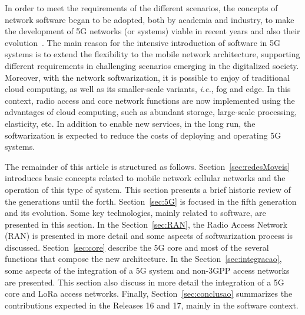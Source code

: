 In order to meet the requirements of the different scenarios, the concepts of network software began to be adopted, both by academia and industry, to make the development of 5G networks (or systems) viable in recent years and also their evolution~\cite{foukas2017network}. The main reason for the intensive introduction of software in 5G systems is to extend the flexibility to the mobile network architecture, supporting different requirements in challenging scenarios emerging in the digitalized society. Moreover, with the network softwarization, it is possible to enjoy of traditional cloud computing, as well as its smaller-scale variants, \textit{i.e.}, fog and edge. In this context, radio access and core network functions are now implemented using the advantages of cloud computing, such as abundant storage, large-scale processing, elasticity, etc. In addition to enable new services, in the long run, the softwarization is expected to reduce the costs of deploying and operating 5G systems.

The remainder of this article is structured as follows. Section~\ref{sec:redesMoveis} introduces basic concepts related to mobile network cellular networks and the operation of this type of system. This section presents a brief historic review of the generations until the forth. Section~\ref{sec:5G} is focused in the fifth generation and its evolution. Some key technologies, mainly related to software, are presented in this section. In the Section~\ref{sec:RAN}, the Radio Access Network (RAN) is presented in more detail and some aspects of softwarization process is discussed. Section~\ref{sec:core} describe the 5G core and most of the several functions that compose the new architecture. In the Section~\ref{sec:integracao}, some aspects of the integration of a 5G system and non-3GPP access networks are presented. This section also discuss in more detail the integration of a 5G core and LoRa access networks. Finally, Section~\ref{sec:conclusao} summarizes the contributions expected in the Releases 16 and 17, mainly in the software context.